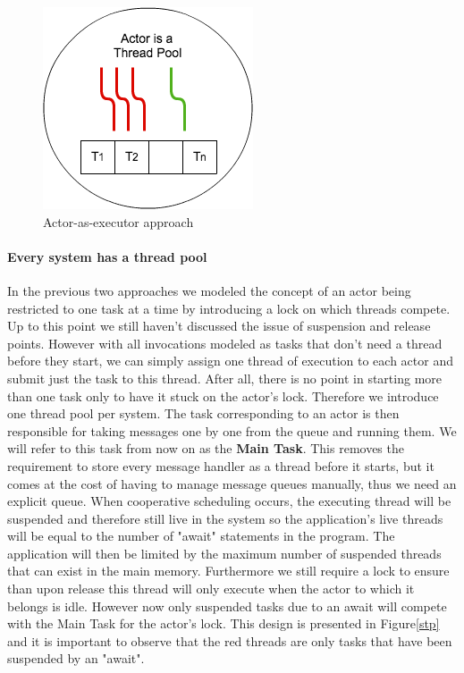 \begin{figure}
	\label{atp}
	\centering
	\includegraphics[scale=0.7]{atp.png}
	\caption{Actor-as-executor approach}
\end{figure}

\paragraph{Every system has a thread pool}
In the previous two approaches we modeled the concept of an actor being restricted to one task at a time by introducing a lock on which threads compete. Up to this point we still haven't discussed the issue of suspension and release points. However with all invocations modeled as tasks that don't need a thread before they start, we can simply assign one thread of execution to each actor and submit just the task to this thread. After all, there is no point in starting more than one task only to have it stuck on the actor's lock. Therefore we introduce one thread pool per system. The task corresponding to an actor is then responsible for taking messages one by one from the queue and running them. We will refer to this task from now on as the \textbf{Main Task}. This removes the requirement to store every message handler as a thread before it starts, but it comes at the cost of having to manage message queues manually, thus we need an explicit queue.
When cooperative scheduling occurs, the executing thread will be suspended and therefore still live in the system so the application's live threads will be equal to the number of "await" statements in the program. The application will then be limited by the maximum number of suspended threads that can exist in the main memory.  Furthermore we still require a lock to ensure than upon release this thread will only execute when the actor to which it belongs is idle. However now only suspended tasks due to an await will compete with the Main Task for the actor's lock. This design is presented in Figure\ref{stp} and it is important to observe that the red threads are only tasks that have been suspended by an "await".


